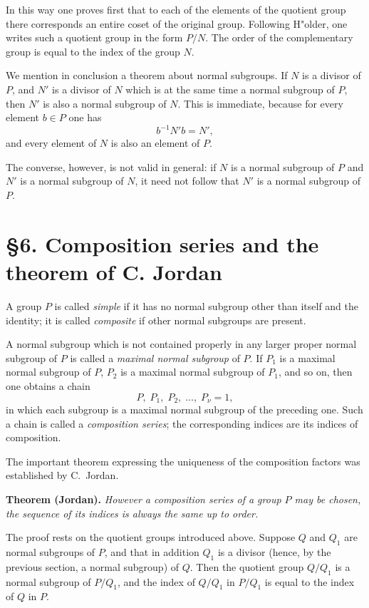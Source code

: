 \documentclass[11pt,a4paper]{book}
\begin{document}
In this way one proves first that to each of the elements of the quotient group there corresponds an entire coset of the original group. Following H"older, one writes such a quotient group in the form $P/N$. The order of the complementary group is equal to the index of the group $N$.

We mention in conclusion a theorem about normal subgroups. If $N$ is a divisor of $P$, and $N'$ is a divisor of $N$ which is at the same time a normal subgroup of $P$, then $N'$ is also a normal subgroup of $N$. This is immediate, because for every element $b\in P$ one has
\[
 b^{-1}N'b = N',
\]
and every element of $N$ is also an element of $P$.

The converse, however, is not valid in general: if $N$ is a normal subgroup of $P$ and $N'$ is a normal subgroup of $N$, it need not follow that $N'$ is a normal subgroup of $P$.

\section*{§6. Composition series and the theorem of C. Jordan}
A group $P$ is called \emph{simple} if it has no normal subgroup other than itself and the identity; it is called \emph{composite} if other normal subgroups are present.

A normal subgroup which is not contained properly in any larger proper normal subgroup of $P$ is called a \emph{maximal normal subgroup} of $P$. If $P_1$ is a maximal normal subgroup of $P$, $P_2$ is a maximal normal subgroup of $P_1$, and so on, then one obtains a chain
\[
 P,\; P_1,\; P_2,\; \dots,\; P_\nu = 1,
\]
in which each subgroup is a maximal normal subgroup of the preceding one. Such a chain is called a \emph{composition series}; the corresponding indices are its indices of composition.

The important theorem expressing the uniqueness of the composition factors was established by C.~Jordan.

\medskip
\noindent\textbf{Theorem (Jordan).} \emph{However a composition series of a group $P$ may be chosen, the sequence of its indices is always the same up to order.}
\medskip

The proof rests on the quotient groups introduced above. Suppose $Q$ and $Q_1$ are normal subgroups of $P$, and that in addition $Q_1$ is a divisor (hence, by the previous section, a normal subgroup) of $Q$. Then the quotient group $Q/Q_1$ is a normal subgroup of $P/Q_1$, and the index of $Q/Q_1$ in $P/Q_1$ is equal to the index of $Q$ in $P$.
\end{document}
